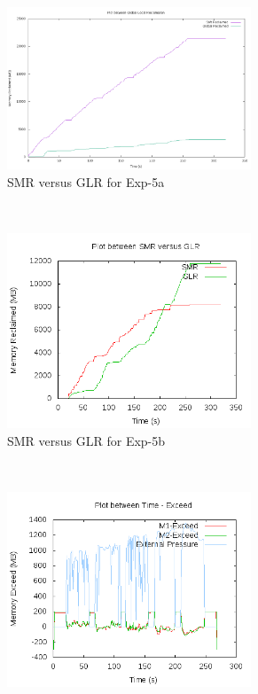 	\begin{figure}[t!]
	  \centering
	  \begin{subfigure}[t]{0.48\textwidth}
	    \centering
	    \includegraphics[width=0.8\textwidth]{images/experimentation/sl_vary/1/compare.png}
	    \caption{SMR versus GLR for Exp-5a}
	    \label{img_sl_vary_1_compare}
	  \end{subfigure}
	  ~ 
	  \begin{subfigure}[t]{0.48\textwidth}
	    \centering
	    \includegraphics[width=0.8\textwidth]{images/experimentation/sl_vary/2/compare.png}
	    \caption{SMR versus GLR for Exp-5b}
	    \label{img_sl_vary_2_compare}
	  \end{subfigure}
	  ~ 
	  \begin{subfigure}[t]{0.48\textwidth}
	     \centering
	    \includegraphics[width=0.8\textwidth]{images/experimentation/sl_vary/2/Exceed.png}

\end{subfigure}
\end{figure}

